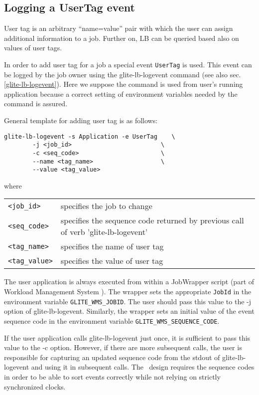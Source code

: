 \subsection{Logging a UserTag event}
\label{log_usertag}

User tag is an arbitrary ``name=value'' pair with which the user can 
assign additional information to a job. Further on, LB can be queried
based also on values of user tags.

In order to add user tag for a job a special event \verb+UserTag+ is used. This
event can be logged by the job owner using the glite-lb-logevent command (see also
sec.\ref{glite-lb-logevent}). Here we suppose the command is used from user's running
 application because a correct setting of environment variables needed by 
the command is assured.

General template for adding user tag is as follows:

\begin{verbatim}
glite-lb-logevent -s Application -e UserTag    \
        -j <job_id>                         \
        -c <seq_code>                       \
        --name <tag_name>                   \
        --value <tag_value>
\end{verbatim}

where

\begin{tabularx}{\textwidth}{lX}
\verb'<job_id>'    & specifies the job to change \\
\verb'<seq_code>'   & specifies the sequence code returned by previous call
			of verb 'glite-lb-logevent'\\
\verb'<tag_name>'    & specifies the name of user tag\\
\verb'<tag_value>' & specifies the value of user tag\\
\end{tabularx}

The user application is always executed from within a JobWrapper script (part of Workload Management System \cite{jgc}). The wrapper  sets the  appropriate \verb'JobId' in the environment variable \verb'GLITE_WMS_JOBID'. The user should pass this value to the -j option of glite-lb-logevent.  Similarly, the wrapper sets an initial value of the event sequence code in the environment variable \verb'GLITE_WMS_SEQUENCE_CODE'.

If the user application calls glite-lb-logevent just once, it is sufficient to pass this value to the -c option.  However, if there are more  subsequent calls,  the  user is responsible for capturing an updated sequence code from the stdout of glite-lb-logevent and using it in subsequent calls.  The \LB\ design requires the sequence codes in  order  to  be able to sort events correctly while not relying on strictly synchronized clocks.  


